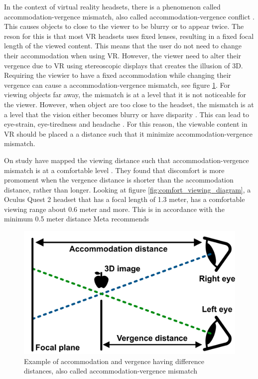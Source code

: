 \documentclass{sigchi}
\begin{document}
In the context of virtual reality headsets, there is a phenomenon called accommodation-vergence mismatch, also called accommodation-vergence conflict \cite{kramida_resolving_2016}. This causes objects to close to the viewer to be blurry or to appear twice. The reson for this is that most VR headsets uses fixed lenses, resulting in a fixed focal length of the viewed content. This means that the user do not need to change their accommodation when using VR. However, the viewer need to alter their vergence due to VR using stereoscopic displays that creates the illusion of 3D. Requiring the viewier to have a fixed accommodation while changing their vergence can cause a accommodation-vergence mismatch, see figure \ref{fig:accommodation_vergence_conflict}. For viewing objects far away, the mismatch is at a level that it is not noticeable for the viewer. However, when object are too close to the headset, the mismatch is at a level that the vision either becomes blurry or have disparity \cite{hoffman_vergenceaccommodation_2008}. This can lead to eye-strain, eye-tiredness and headache \cite{shibata_zone_2011}. For this reason, the viewable content in VR should be placed a a distance such that it minimize accommodation-vergence mismatch.

On study have mapped the viewing distance such that accommodation-vergence mismatch is at a comfortable level \cite{shibata_zone_2011}. They found that discomfort is more promoment when the vergence distance is shorter than the accommodation distance, rather than longer. Looking at figure \ref{fig:comfort_viewing_diagram}, a Oculus Quest 2 headset that has a focal length of 1.3 meter, has a comfortable viewing range about 0.6 meter and more. This is in accordance with the minimum 0.5 meter distance Meta recommends \cite{noauthor_vision_nodate}

\begin{figure}[h]
  \includegraphics[width=\linewidth]{figures/AccommodationVergenceConflict.png}
  \caption{Example of accommodation and vergence having difference distances, also called accommodation-vergence mismatch}
  \label{fig:accommodation_vergence_conflict}
\end{figure}
\end{document}
